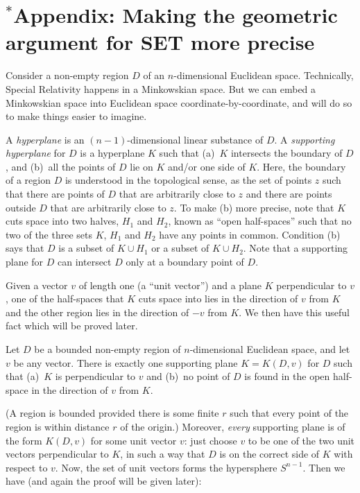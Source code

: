 \section*{$^*$Appendix: Making the geometric argument for SET more precise}
Consider a non-empty region $D$ of an $n$-dimensional Euclidean space. Technically, Special Relativity happens in a 
Minkowskian space. But we can embed a Minkowskian space into Euclidean space coordinate-by-coordinate, and will do so 
to make things easier to imagine.

A \textit{hyperplane} is an $(n-1)$-dimensional linear substance of $D$. A \textit{supporting hyperplane} for $D$ is a hyperplane $K$ such that (a)~$K$ intersects the  boundary of $D$, and (b)~all the points of $D$ lie on $K$ and/or one side of $K$. Here, the boundary of a region $D$ is understood in the topological sense, as the set of points $z$ such that there are points of $D$ that are arbitrarily close to $z$ and there are points outside $D$ that are arbitrarily close to $z$. To make (b) more precise, note that $K$ cuts space into two halves, $H_1$ and $H_2$, known as “open half-spaces” such that no two of the three sets $K$, $H_1$ and $H_2$ have any points in common. Condition (b) says that $D$ is a subset of $K\cup H_1$ or a subset of $K\cup H_2$.
Note that a supporting plane for $D$ can intersect $D$ only at a boundary point of $D$. 

Given a vector $v$ of length one (a ``unit vector'') and a plane $K$ perpendicular to $v$, one of the half-spaces that $K$ cuts space into lies in the direction of $v$ from $K$ and the other region lies in the direction of $-v$ from $K$.  We then have this 
useful fact which will be proved later.

\begin{lem}\label{lem:one-supp} Let $D$ be a bounded non-empty region of $n$-dimensional Euclidean space, and let $v$ be any vector. There is exactly one supporting plane $K=K(D,v)$ for $D$ such that (a)~$K$ is perpendicular to $v$ and (b)~no point of $D$ is found in the open half-space in the direction of $v$ from $K$.
\end{lem}

(A region is bounded provided there is some finite $r$ such that every point of the region is within distance $r$ of the origin.) Moreover, \textit{every} supporting plane is of the form $K(D,v)$ for some unit vector $v$: just choose $v$ to be one of the two unit vectors perpendicular to $K$, in such a way that $D$ is on the correct side of $K$ with respect to $v$. Now, the set of unit vectors forms the hypersphere $S^{n-1}$. Then we have (and again the proof will be given later):

